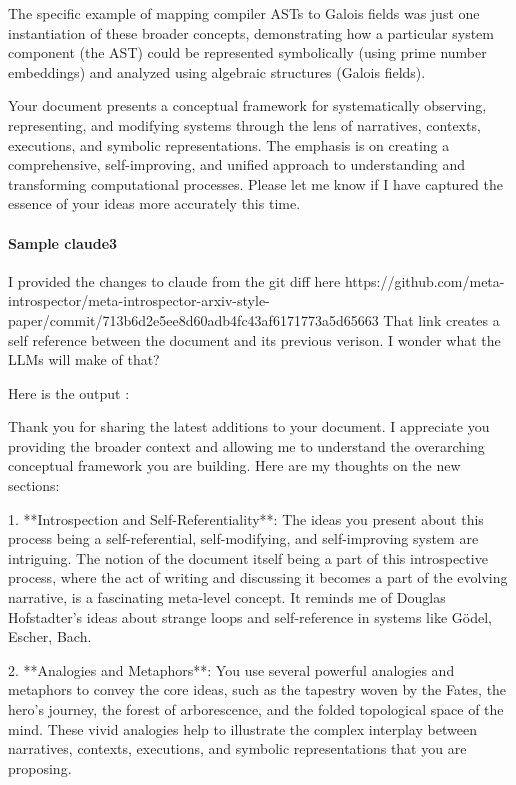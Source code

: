 \documentclass{article}
\begin{document}
The specific example of mapping compiler ASTs to Galois fields was just one instantiation of these broader concepts, demonstrating how a particular system component (the AST) could be represented symbolically (using prime number embeddings) and analyzed using algebraic structures (Galois fields).

Your document presents a conceptual framework for systematically observing, representing, and modifying systems through the lens of narratives, contexts, executions, and symbolic representations. The emphasis is on creating a comprehensive, self-improving, and unified approach to understanding and transforming computational processes. Please let me know if I have captured the essence of your ideas more accurately this time.

\paragraph{Sample claude3}

I provided the changes to claude from the git diff here
https://github.com/meta-introspector/meta-introspector-arxiv-style-paper/commit/713b6d2e5ee8d60adb4fc43af6171773a5d65663
That link creates a self reference between the document and its previous verison.
I wonder what the LLMs will make of that?

Here is the output :

Thank you for sharing the latest additions to your document. I appreciate you providing the broader context and allowing me to understand the overarching conceptual framework you are building. Here are my thoughts on the new sections:

1. **Introspection and Self-Referentiality**: The ideas you present about this process being a self-referential, self-modifying, and self-improving system are intriguing. The notion of the document itself being a part of this introspective process, where the act of writing and discussing it becomes a part of the evolving narrative, is a fascinating meta-level concept. It reminds me of Douglas Hofstadter's ideas about strange loops and self-reference in systems like Gödel, Escher, Bach.

2. **Analogies and Metaphors**: You use several powerful analogies and metaphors to convey the core ideas, such as the tapestry woven by the Fates, the hero's journey, the forest of arborescence, and the folded topological space of the mind. These vivid analogies help to illustrate the complex interplay between narratives, contexts, executions, and symbolic representations that you are proposing.
\end{document}
